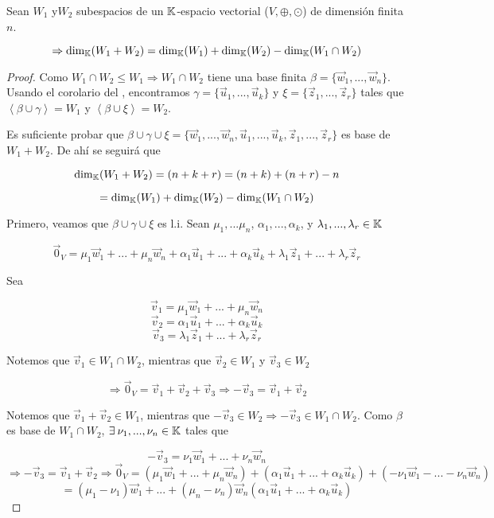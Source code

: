 \begin{theorem}
    Sean $W_1$ y$ W_2$ subespacios de un $\mathbb{K}$-espacio vectorial ($V, \oplus, \odot$) de dimensión finita $n$.

    $$\Rightarrow {\dim}_{\mathbb{K}}(W_1+W_2) = {\dim}_{\mathbb{K}}(W_1) + {\dim}_{\mathbb{K}}(W_2) - {\dim}_{\mathbb{K}}(W_1 \cap W_2)$$
\end{theorem}

\begin{proof}
    Como $W_1 \cap W_2 \leq W_1 \Rightarrow W_1 \cap W_2 $ tiene una base finita $\beta = \{ \vec{w}_1, ..., \vec{w}_n \}$. Usando el corolario del , encontramos $\gamma = \{ \vec{u}_1, ..., \vec{u}_k \}$ y $\xi = \{ \vec{z}_1, ..., \vec{z}_r \}$ tales que $\left\langle \beta \cup \gamma \right\rangle = W_1$ y  $\left\langle \beta \cup \xi \right\rangle = W_2$. 

    Es suficiente probar que $\beta \cup \gamma \cup \xi = \{\vec{w}_1, ..., \vec{w}_n, \vec{u}_1, ..., \vec{u}_k, \vec{z}_1, ..., \vec{z}_r  \}$ es base de $W_1+W_2$. De ahí se seguirá que 

    $${\dim}_{\mathbb{K}}(W_1+W_2) = (n+k+r) = (n+k) + (n+r) - n $$

    $$=  {\dim}_{\mathbb{K}}(W_1) + {\dim}_{\mathbb{K}}(W_2) - {\dim}_{\mathbb{K}}(W_1 \cap W_2)$$

    Primero, veamos que  $\beta \cup \gamma \cup \xi $ es l.i. Sean $\mu_1, ... \mu_n$, $\alpha_1, ..., \alpha_k$, y $\lambda_1, ..., \lambda_r \in \mathbb{K}$ 

    $$ \vec{0}_V = \mu_1 \vec{w}_1 +  ... + \mu_n \vec{w}_n +  \alpha_1\vec{u}_1 + ... + \alpha_k\vec{u}_k + \lambda_1\vec{z}_1 + ...+ \lambda_r\vec{z}_r$$

    Sea

    $$\vec{v}_1 = \mu_1 \vec{w}_1 +  ... + \mu_n \vec{w}_n$$
    $$\vec{v}_2 = \alpha_1\vec{u}_1 + ... + \alpha_k\vec{u}_k$$
    $$\vec{v}_3 = \lambda_1\vec{z}_1 + ...+ \lambda_r\vec{z}_r$$

    Notemos que $\vec{v}_1 \in W_1 \cap W_2$, mientras que $\vec{v}_2 \in W_1 $ y $\vec{v}_3 \in W_2$

    $$\Rightarrow \vec{0}_V = \vec{v}_1 + \vec{v}_2 + \vec{v}_3 \Rightarrow -\vec{v}_3 = \vec{v}_1 + \vec{v}_2$$

    Notemos que $\vec{v}_1 + \vec{v}_2 \in W_1$, mientras que $-\vec{v}_3 \in W_2 \Rightarrow  -\vec{v}_3 \in W_1 \cap W_2$. Como $\beta$ es base de $ W_1 \cap W_2$, $\exists \: \nu_1, ..., \nu_n \in \mathbb{K}$ tales que

    $$-\vec{v}_3  = \nu_1\vec{w}_1 + ... + \nu_n\vec{w}_n $$
    $$\Rightarrow -\vec{v}_3 = \vec{v}_1 + \vec{v}_2 \Rightarrow  \vec{0}_V =  (\mu_1 \vec{w}_1 +  ... + \mu_n \vec{w}_n)+ (\alpha_1\vec{u}_1 + ... + \alpha_k\vec{u}_k) + (-\nu_1\vec{w}_1 - ... - \nu_n\vec{w}_n)$$
    $$= (\mu_1-\nu_1)\vec{w}_1  + ... + (\mu_n-\nu_n)\vec{w}_n  (\alpha_1\vec{u}_1 + ... + \alpha_k\vec{u}_k)$$


\end{proof}
